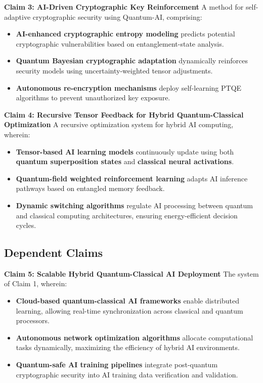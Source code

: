 \documentclass{article}
\theoremstyle{plain}
\begin{document}
\noindent \textbf{Claim 3: AI-Driven Cryptographic Key Reinforcement}  
A method for self-adaptive cryptographic security using Quantum-AI, comprising:

\begin{itemize}
    \item \textbf{AI-enhanced cryptographic entropy modeling} predicts potential cryptographic vulnerabilities based on entanglement-state analysis.
    \item \textbf{Quantum Bayesian cryptographic adaptation} dynamically reinforces security models using uncertainty-weighted tensor adjustments.
    \item \textbf{Autonomous re-encryption mechanisms} deploy self-learning PTQE algorithms to prevent unauthorized key exposure.
\end{itemize}

\noindent \textbf{Claim 4: Recursive Tensor Feedback for Hybrid Quantum-Classical Optimization}  
A recursive optimization system for hybrid AI computing, wherein:

\begin{itemize}
    \item \textbf{Tensor-based AI learning models} continuously update using both \textbf{quantum superposition states} and \textbf{classical neural activations}.
    \item \textbf{Quantum-field weighted reinforcement learning} adapts AI inference pathways based on entangled memory feedback.
    \item \textbf{Dynamic switching algorithms} regulate AI processing between quantum and classical computing architectures, ensuring energy-efficient decision cycles.
\end{itemize}

\subsection{Dependent Claims}

\noindent \textbf{Claim 5: Scalable Hybrid Quantum-Classical AI Deployment}  
The system of Claim 1, wherein:

\begin{itemize}
    \item \textbf{Cloud-based quantum-classical AI frameworks} enable distributed learning, allowing real-time synchronization across classical and quantum processors.
    \item \textbf{Autonomous network optimization algorithms} allocate computational tasks dynamically, maximizing the efficiency of hybrid AI environments.
    \item \textbf{Quantum-safe AI training pipelines} integrate post-quantum cryptographic security into AI training data verification and validation.
\end{itemize}
\end{document}
